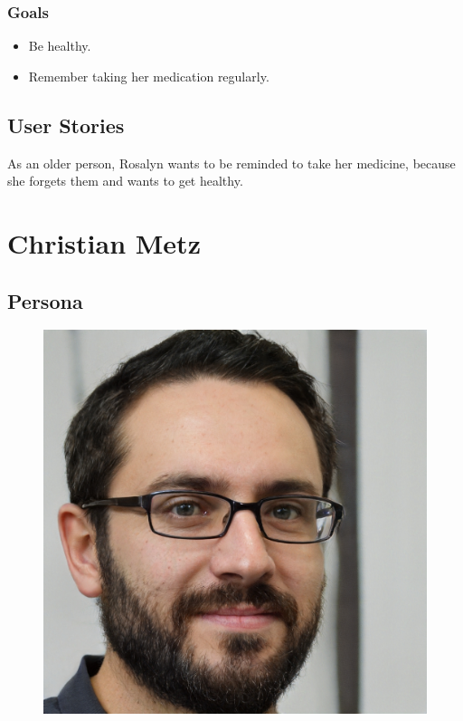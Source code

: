 \documentclass[12pt, a4paper, ngerman]{article}
\begin{document}
\subsubsection*{Goals}

\begin{itemize}[noitemsep]
	\item Be healthy.
	\item Remember taking her medication regularly.
\end{itemize}

\subsection*{User Stories}

As an older person, Rosalyn wants to be reminded to take her medicine, because she forgets them and wants to get healthy.


\newpage

\section*{Christian Metz}
\subsection*{Persona}

\begin{figure}[htp]
\centering
  \includegraphics[height=0.5\textwidth]{images/persona02.jpg}
\end{figure}
\let\thefootnote\relax{}
\end{document}
